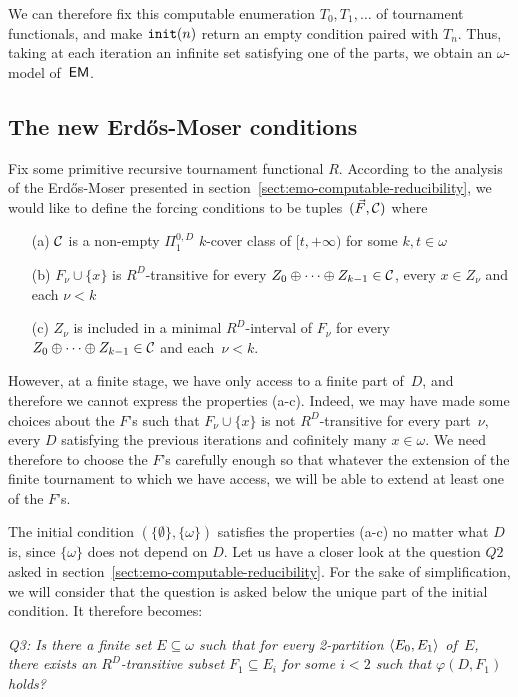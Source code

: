 We can therefore fix this computable enumeration $T_0, T_1, \dots$
of tournament functionals, and make $\mathtt{init}(n)$ return an empty condition
paired with $T_n$. Thus, taking at each iteration an infinite set satisfying one of the parts,
we obtain an $\omega$-model of~$\operatorname{\sf{EM}}$.

\subsection{The new Erd\H{o}s-Moser conditions}\label{subsect:emo-new-condition}

Fix some primitive recursive tournament functional $R$.
According to the analysis of the Erd\H{o}s-Moser presented in section~\ref{sect:emo-computable-reducibility},
we would like to define the forcing conditions to be tuples~$(\vec{F}, \mathcal{C})$ where
\begin{itemize}
	\item[(a)] $\mathcal{C}$ is a non-empty $\Pi^{0,D}_1$ $k$-cover class of $[t, +\infty)$ 
	for some $k, t \in \omega$
	\item[(b)] $F_\nu \cup \{x\}$ is $R^D$-transitive for every $Z_0 \oplus \dots \oplus Z_{k-1} \in \mathcal{C}$,
	every $x \in Z_\nu$ and each $\nu < k$
	\item[(c)] $Z_\nu$ is included in a minimal $R^D$-interval of $F_\nu$
	for every $Z_0 \oplus \dots \oplus Z_{k-1} \in \mathcal{C}$ and each~$\nu < k$.
\end{itemize}

However, at a finite stage, we have only access to a finite part of~$D$,
and therefore we cannot express the properties (a-c). Indeed,
we may have made some choices about the $F$'s such that $F_\nu \cup \{x\}$
is not $R^D$-transitive for every part~$\nu$, every $D$ satisfying the previous iterations and cofinitely many $x \in \omega$.
We need therefore to choose the $F$'s carefully enough so that whatever the extension of the finite tournament
to which we have access, we will be able to extend at least one of the $F$'s.

The initial condition $(\{\emptyset\}, \{\omega\})$ satisfies the properties (a-c) no matter what $D$ is, since $\{\omega\}$
does not depend on $D$.
Let us have a closer look at the question $Q2$ asked in section~\ref{sect:emo-computable-reducibility}.
For the sake of simplification, we will consider that the question is asked below the unique 
part of the initial condition. It therefore becomes:

\smallskip
{\itshape
Q3: Is there a finite set $E \subseteq \omega$ such that for every 2-partition $\left\langle E_0, E_1 \right\rangle$ of~$E$,
there exists an $R^D$-transitive subset $F_1 \subseteq E_i$ for some $i < 2$ such that $\varphi(D, F_1)$ holds?
}
\smallskip

